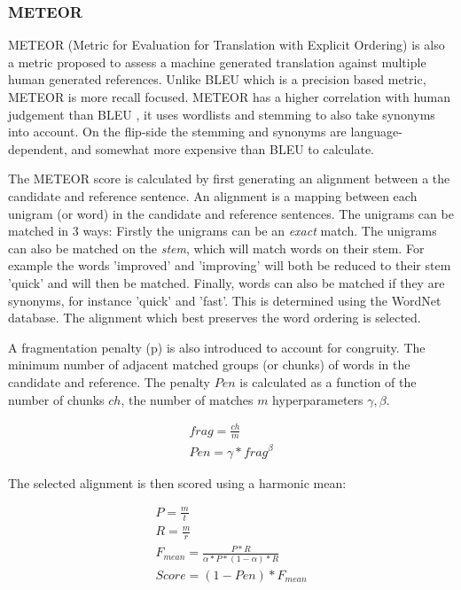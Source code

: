 \subsubsection{METEOR}
METEOR (Metric for Evaluation for Translation with Explicit Ordering) \cite{Meteor} is also a metric proposed to assess a machine generated translation against multiple human generated references. Unlike BLEU which is a precision based metric, METEOR is more recall focused. METEOR has a higher correlation with human judgement than BLEU \cite{recommend_summarization}, it uses wordlists and stemming to also take synonyms into account. On the flip-side the stemming and synonyms are language-dependent, and somewhat more expensive than BLEU to calculate.

The METEOR score is calculated by first generating an alignment between a the candidate and reference sentence. An alignment is a mapping between each unigram (or word) in the candidate and reference sentences. The unigrams can be matched in 3 ways: Firstly the unigrams can be an \textit{exact} match. The unigrams can also be matched on the \textit{stem}, which will match words on their stem. For example the words 'improved' and 'improving' will both be reduced to their stem 'quick' and will then be matched. Finally, words can also be matched if they are synonyms, for instance 'quick' and 'fast'. This is determined using the WordNet database. The alignment which best preserves the word ordering is selected. 

A fragmentation penalty (p) is also introduced to account for congruity. The minimum number of adjacent matched groups (or chunks) of words in the candidate and reference. The penalty \(Pen\) is calculated as a function of the number of chunks \(ch\), the number of matches \(m\) hyperparameters \(\gamma, \beta\).

\begin{equation}
\begin{aligned}
frag = \frac{ch}{m} \\
Pen = \gamma * frag^{\beta}
\end{aligned}
\end{equation}

The selected alignment is then scored using a harmonic mean:

\begin{equation}
  \begin{aligned}
P = \frac{m}{t} \\
R = \frac{m}{r} \\
F_{mean} = \frac{P*R}{\alpha * P * (1 - \alpha) * R} \\
Score = (1 - Pen) * F_{mean}
\end{aligned}
\end{equation}


